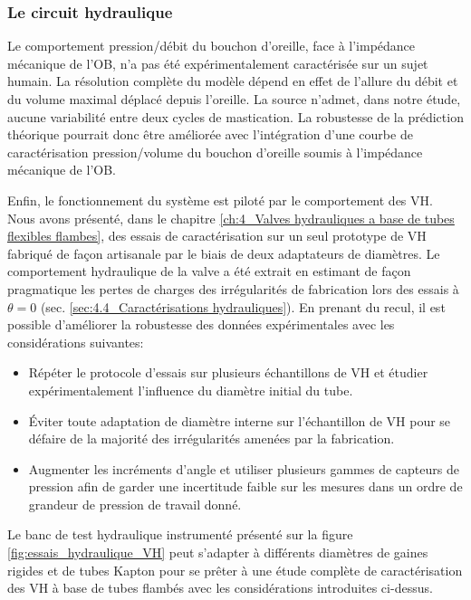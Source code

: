 		\subsubsection{Le circuit hydraulique}
		\label{subsec:6.4.2.b}
Le comportement pression/débit du bouchon d'oreille, face à l'impédance mécanique de l'OB, n'a pas été expérimentalement caractérisée sur un sujet humain. La résolution complète du modèle dépend en effet de l'allure du débit et du volume maximal déplacé depuis l'oreille. La source n'admet, dans notre étude, aucune variabilité entre deux cycles de mastication. La robustesse de la prédiction théorique pourrait donc être améliorée avec l'intégration d'une courbe de caractérisation pression/volume du bouchon d'oreille soumis à l'impédance mécanique de l'OB.

Enfin, le fonctionnement du système est piloté par le comportement des VH. Nous avons présenté, dans le chapitre \ref{ch:4_Valves hydrauliques a base de tubes flexibles flambes}, des essais de caractérisation sur un seul prototype de VH fabriqué de façon artisanale par le biais de deux adaptateurs de diamètres. Le comportement hydraulique de la valve a été extrait en estimant de façon pragmatique les pertes de charges des irrégularités de fabrication lors des essais à $\theta=0$ (sec. \ref{sec:4.4_Caractérisations hydrauliques}). En prenant du recul, il est possible d'améliorer la robustesse des données expérimentales avec les considérations suivantes:
\begin{itemize}[label=$\circ$]
	\item Répéter le protocole d'essais sur plusieurs échantillons de VH et étudier expérimentalement l'influence du diamètre initial du tube.
 	\item Éviter toute adaptation de diamètre interne sur l'échantillon de VH pour se défaire de la majorité des irrégularités amenées par la fabrication.
 	 \item Augmenter les incréments d'angle et utiliser plusieurs gammes de capteurs de pression afin de garder une incertitude faible sur les mesures dans un ordre de grandeur de pression de travail donné.
\end{itemize} 
Le banc de test hydraulique instrumenté présenté sur la figure \ref{fig:essais_hydraulique_VH} peut s'adapter à différents diamètres de gaines rigides et de tubes Kapton pour se prêter à une étude complète de caractérisation des VH à base de tubes flambés avec les considérations introduites ci-dessus.
